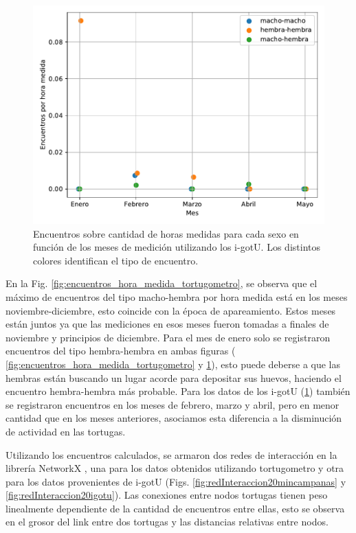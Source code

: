 \begin{figure}[ht]
    \begin{center}
       
   
    \includegraphics[width=\imsize]{Chap2/encuentros_por_hora_igotu.pdf}
\end{center}
    \caption[Encuentros por hora medida tomando los datos de los i-gotU.]{Encuentros sobre cantidad de horas medidas para cada sexo en función de los meses de medición utilizando los i-gotU. Los distintos colores identifican el tipo de encuentro.}
    \label{fig:encuentros_hora_medida_igotu}
\end{figure}
En la Fig. \ref{fig:encuentros_hora_medida_tortugometro}, se observa que el máximo de encuentros del tipo macho-hembra por hora medida está en los meses noviembre-diciembre, esto coincide con la época de apareamiento. Estos meses están juntos ya que las mediciones en esos meses fueron tomadas a finales de noviembre y principios de diciembre. Para el mes de enero solo se registraron encuentros del tipo hembra-hembra en ambas figuras ( \ref{fig:encuentros_hora_medida_tortugometro} y \ref{fig:encuentros_hora_medida_igotu}), esto puede deberse a que las hembras están buscando un lugar acorde para depositar sus huevos, haciendo el encuentro hembra-hembra más probable. Para los datos de los i-gotU (\ref{fig:encuentros_hora_medida_igotu}) también se registraron encuentros en los meses de febrero, marzo y abril, pero en menor cantidad que en los meses anteriores, asociamos esta diferencia a la disminución de actividad en las tortugas.
 
 
Utilizando los encuentros calculados, se armaron dos redes de interacción  en la librería NetworkX \cite{networkx}, una para los datos obtenidos utilizando  tortugometro y otra para los datos provenientes de i-gotU (Figs. \ref{fig:redInteraccion20mincampanas} y \ref{fig:redInteraccion20igotu}). Las conexiones entre nodos tortugas tienen peso linealmente dependiente de la cantidad de encuentros entre ellas, esto se observa en el grosor del link entre dos tortugas y las distancias relativas entre nodos.
 
